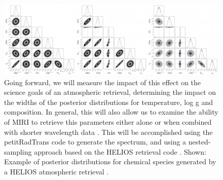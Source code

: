 \documentclass[]{article}
\begin{document}
\begin{figure}[h]
	\centering
	\includegraphics[width=\linewidth]{HeliosExample.png}
	\caption{Going forward, we will measure the impact of this effect on the science goals of an atmospheric retrieval, determining the impact on the widths of the posterior distributions for temperature, log g and composition. In general, this will also allow us to examine the ability of MIRI to retrieve this parameters either alone or when combined with shorter wavelength data \cite{Schlawin2018, Batalha2018}. This will be accomplished using the petitRadTrans code \cite{Molliere2019} to generate the spectrum, and using a nested-sampling approach based on the HELIOS retrieval code \cite{Lavie2017}. Shown: Example of posterior distributions for chemical species generated by a HELIOS atmospheric retrieval \cite{Lavie2017}.}
\end{figure}
\clearpage
\printbibliography
\end{document}
